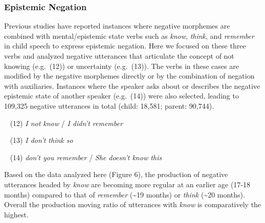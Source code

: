 \documentclass[
  english,
  man,floatsintext]{apa6}
\begin{document}
\clearpage

\hypertarget{epistemic-negation}{%
\subsubsection{Epistemic Negation}\label{epistemic-negation}}

Previous studies have reported instances where negative morphemes are combined with mental/epistemic state verbs such as \emph{know}, \emph{think}, and \emph{remember} in child speech to express epistemic negation. Here we focused on these three verbs and analyzed negative utterances that articulate the concept of not knowing (e.g.~(12)) or uncertainty (e.g.~(13)). The verbs in these cases are modified by the negative morphemes directly or by the combination of negation with auxiliaries. Instances where the speaker asks about or describes the negative epistemic state of another speaker (e.g.~(14)) were also selected, leading to 109,325 negative utterances in total (child: 18,581; parent: 90,744).

~
(12) \emph{I not know} / \emph{I didn't remember}

~
(13) \emph{I don't think so}

~
(14) \emph{don't you remember} / \emph{She doesn't know this}

Based on the data analyzed here (Figure 6), the production of negative utterances headed by \emph{know} are becoming more regular at an earlier age (17-18 months) compared to that of \emph{remember} (\textasciitilde19 months) or \emph{think} (\textasciitilde20 months). Overall the production moving ratio of utterances with \emph{know} is comparatively the highest.
\end{document}
